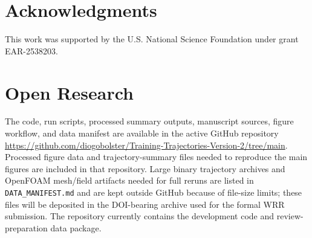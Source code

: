 \documentclass[11pt]{article}
\begin{document}
\section*{Acknowledgments}

This work was supported by the U.S. National Science Foundation under grant EAR-2538203.

\section*{Open Research}

The code, run scripts, processed summary outputs, manuscript sources, figure workflow, and data manifest are available in the active GitHub repository \url{https://github.com/diogobolster/Training-Trajectories-Version-2/tree/main}. Processed figure data and trajectory-summary files needed to reproduce the main figures are included in that repository. Large binary trajectory archives and OpenFOAM mesh/field artifacts needed for full reruns are listed in \texttt{DATA\_MANIFEST.md} and are kept outside GitHub because of file-size limits; these files will be deposited in the DOI-bearing archive used for the formal WRR submission. The repository currently contains the development code and review-preparation data package.



\end{document}
